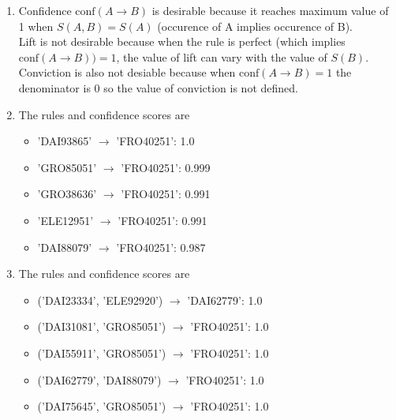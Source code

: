 \documentclass[12pt]{article}
\begin{document}
\begin{enumerate}[label=(\alph*)]
\begin{itemize}
	\end{itemize}
	\item
	Confidence $\text{conf}(A \rightarrow B)$ is desirable because it reaches maximum value of 1 when $S(A, B) = S(A)$ (occurence of A implies occurence of B). \\
	Lift is not desirable because when the rule is perfect (which implies $\text{conf}(A \rightarrow B)) = 1$, the value of lift can vary with the value of $S(B)$. \\
	Conviction is also not desiable because when $\text{conf}(A \rightarrow B) = 1$ the denominator is 0 so the value of conviction is not defined.
	\item
	The rules and confidence scores are
	\begin{itemize}
		\item 'DAI93865' $\rightarrow$ 'FRO40251': 1.0
		\item 'GRO85051' $\rightarrow$ 'FRO40251': 0.999
		\item 'GRO38636' $\rightarrow$ 'FRO40251': 0.991
		\item 'ELE12951' $\rightarrow$ 'FRO40251': 0.991
		\item 'DAI88079' $\rightarrow$ 'FRO40251': 0.987
	\end{itemize}
	\item
	The rules and confidence scores are
	\begin{itemize}
		\item ('DAI23334', 'ELE92920') $\rightarrow$ 'DAI62779': 1.0
		\item ('DAI31081', 'GRO85051') $\rightarrow$ 'FRO40251': 1.0
		\item ('DAI55911', 'GRO85051') $\rightarrow$ 'FRO40251': 1.0
		\item ('DAI62779', 'DAI88079') $\rightarrow$ 'FRO40251': 1.0
		\item ('DAI75645', 'GRO85051') $\rightarrow$ 'FRO40251': 1.0
	\end{itemize}
\end{enumerate}
\end{document}
